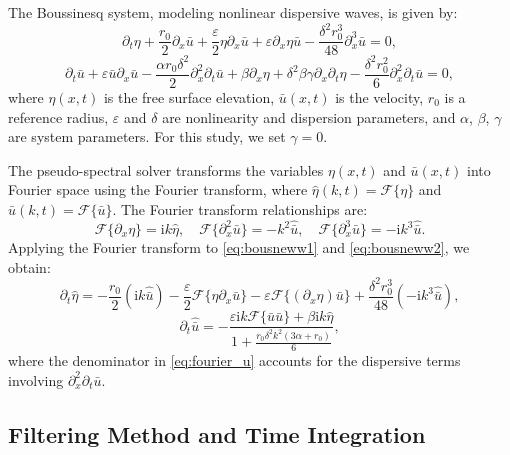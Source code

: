\documentclass[alpha-refs, 12pt]{wiley-article}
\newcommand{\ui}{\mathrm{i}}
\newcommand{\eps}{\varepsilon}
\begin{document}
The Boussinesq system, modeling nonlinear dispersive waves, is given by:
\begin{equation}\label{eq:bousneww1}
  \partial_t \eta + \frac{r_0}{2} \partial_x \bar{u} + \frac{\eps}{2} \eta \partial_x \bar{u} + \eps \partial_x \eta \bar{u} - \frac{\delta^2 r_0^3}{48} \partial_x^3 \bar{u} = 0,
\end{equation}
\begin{equation}\label{eq:bousneww2}
  \partial_t \bar{u} + \eps \bar{u} \partial_x \bar{u} - \frac{\alpha r_0 \delta^2}{2} \partial_x^2 \partial_t \bar{u} + \beta \partial_x \eta + \delta^2 \beta \gamma \partial_x \partial_t \eta - \frac{\delta^2 r_0^2}{6} \partial_x^2 \partial_t \bar{u} = 0,
\end{equation}
where $\eta(x,t)$ is the free surface elevation, $\bar{u}(x,t)$ is the velocity, $r_0$ is a reference radius, $\eps$ and $\delta$ are nonlinearity and dispersion parameters, and $\alpha$, $\beta$, $\gamma$ are system parameters. For this study, we set $\gamma = 0$.

The pseudo-spectral solver transforms the variables $\eta(x,t)$ and $\bar{u}(x,t)$ into Fourier space using the Fourier transform, where $\hat{\eta}(k,t) = \mathcal{F}\{\eta\}$ and $\hat{\bar{u}}(k,t) = \mathcal{F}\{\bar{u}\}$. The Fourier transform relationships are:
\[
  \mathcal{F}\{\partial_x \eta\} = \ui k \hat{\eta}, \quad \mathcal{F}\{\partial_x^2 \bar{u}\} = -k^2 \hat{\bar{u}}, \quad \mathcal{F}\{\partial_x^3 \bar{u}\} = -\ui k^3 \hat{\bar{u}}.
\]
Applying the Fourier transform to \eqref{eq:bousneww1} and \eqref{eq:bousneww2}, we obtain:
\begin{equation}\label{eq:fourier_eta}
  \partial_t \hat{\eta} = - \frac{r_0}{2} (\ui k \hat{\bar{u}}) - \frac{\eps}{2} \mathcal{F}\{\eta \partial_x \bar{u}\} - \eps \mathcal{F}\{(\partial_x \eta) \bar{u}\} + \frac{\delta^2 r_0^3}{48} (-\ui k^3 \hat{\bar{u}}),
\end{equation}
\begin{equation}\label{eq:fourier_u}
  \partial_t \hat{\bar{u}} = - \frac{\eps \ui k \mathcal{F}\{\bar{u} \bar{u}\} + \beta \ui k \hat{\eta}}{1 + \frac{r_0 \delta^2 k^2 (3 \alpha + r_0)}{6}},
\end{equation}
where the denominator in \eqref{eq:fourier_u} accounts for the dispersive terms involving $\partial_x^2 \partial_t \bar{u}$.

\subsection{Filtering Method and Time Integration}
\end{document}
